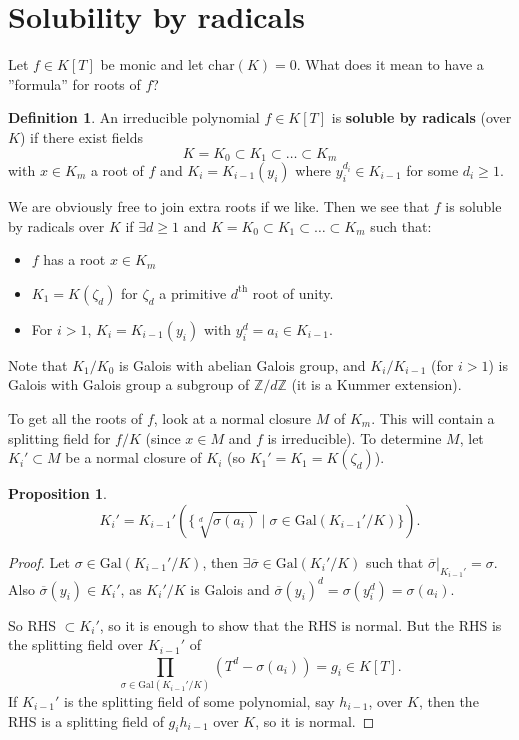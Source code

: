 \documentclass{article}
\theoremstyle{definition}
\newtheorem{prop}[theorem]{Proposition}
\newtheorem{defn}{Definition}[section]
\begin{document}
\section{Solubility by radicals}
Let $f \in K[T]$ be monic and let $\text{char}(K)=0$. What does it mean to have a ''formula'' for roots of $f$?
\begin{defn}
    An irreducible polynomial $f \in K[T]$ is \textbf{soluble by radicals} (over $K$) if there exist fields \[
    K = K_0 \subset K_1 \subset \ldots \subset K_m
    \] with $x \in K_m$ a root of $f$ and $K_i = K_{i-1}(y_i)$ where $y_i^{d_i} \in K_{i-1}$ for some $d_i\ge 1$.
\end{defn}
We are obviously free to join extra roots if we like. Then we see that $f$ is soluble by radicals over $K$ if $\exists d\ge 1$ and $K = K_0 \subset K_1 \subset \ldots \subset K_m$ such that:
\begin{itemize}
    \item $f$ has a root $x \in K_m$
    \item $K_1 = K(\zeta_d)$ for $\zeta_d$ a primitive $d^{\text{th}}$ root of unity.
    \item For $i>1$, $K_i=K_{i-1}(y_i)$ with $y_i^d = a_i \in K_{i-1}$.
\end{itemize}
Note that $K_1/K_0$ is Galois with abelian Galois group, and $K_i/K_{i-1}$ (for $i>1$) is Galois with Galois group a subgroup of $\mathbb{Z}/d\mathbb{Z}$ (it is a Kummer extension).
\vspace{1mm}

To get all the roots of $f$, look at a normal closure $M$ of $K_m$. This will contain a splitting field for $f/K$ (since $x \in M$ and $f$ is irreducible). To determine $M$, let $K_i' \subset M$ be a normal closure of $K_i$ (so $K_1' = K_1 = K(\zeta_d)$).
\begin{prop}\label{16.1}
$$K_i' = K_{i-1}'(\{ \sqrt[d]{\sigma(a_i)} \mid \sigma \in \text{Gal}(K_{i-1}'/K) \}).$$
\end{prop}
\begin{proof}
    Let $\sigma \in \text{Gal}(K_{i-1}'/K)$, then $\exists \overline{\sigma} \in \text{Gal}(K_i'/K)$ such that $\overline{\sigma}|_{K_{i-1}'} = \sigma$. Also $\overline{\sigma}(y_i) \in K_i'$, as $K_i'/K$ is Galois and $\overline{\sigma}(y_i)^d = \sigma(y_i^d) = \sigma(a_i)$.
    \vspace{1mm}
    
    So RHS $\subset K_i'$, so it is enough to show that the RHS is normal. But the RHS is the splitting field over $K_{i-1}'$ of \[
    \prod_{\sigma \in \text{Gal}(K_{i-1}'/K)}^{}(T^d-\sigma(a_i)) = g_i \in K[T].
    \]
    If $K_{i-1}'$ is the splitting field of some polynomial, say $h_{i-1}$, over $K$, then the RHS is a splitting field of $g_i h_{i-1}$ over $K$, so it is normal.
\end{proof}
\end{document}
